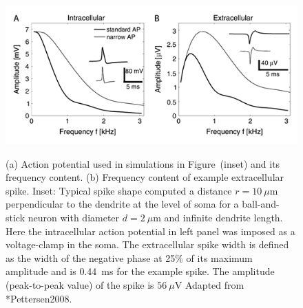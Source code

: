 \begin{figure}[!ht]
\begin{center}
\includegraphics{Figures/Spikes/Spikes-ball-and-stick-frequency-w90-r150}
\end{center}
\caption[]{(a) Action potential used in simulations in Figure~(inset) 
and its frequency content.
(b) Frequency content of example extracellular spike.
Inset: Typical spike shape computed a distance $r=10~\mu$m
perpendicular to the dendrite at the level of soma for a ball-and-stick 
neuron with diameter $d=2~\mu$m and infinite dendrite length.
Here the intracellular action potential in left panel was imposed as a voltage-clamp in the soma.
The extracellular spike width is defined as the width of the negative phase at 25\% of its maximum
amplitude and is 0.44~ms for the example spike.
The amplitude (peak-to-peak value) of the spike is $56~\mu$V  
Adapted from \citeasnoun**{Pettersen2008}.}
 
\label{fig:Spikes:ball-and-stick-frequency}
\end{figure}

%

